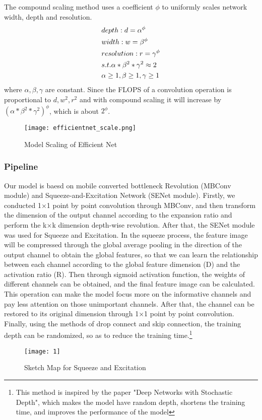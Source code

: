 \documentclass[final]{cvpr}
\begin{document}
The compound scaling method uses a coefficient $\phi$ to uniformly scales network width, depth and resolution.
\begin{equation}
\begin{aligned}
\centering
& depth: d=\alpha^\phi  \\
& width: w=\beta^\phi  \\
& resolution: r=\gamma^\phi  \\
&      s.t. \alpha*\beta^2*\gamma^2\approx2 \\
&           \alpha\geq1,\beta\geq1,\gamma\geq1
\end{aligned}
\end{equation}
where $\alpha,\beta,\gamma$ are constant. Since the FLOPS of a convolution operation is proportional to $d,w^2,r^2$ and with compound scaling it will increase by $(\alpha*\beta^2*\gamma^2)^\phi$, which is about $2^\phi$. 

\begin{figure}[htbp]
    \centering
    \texttt{[image: efficientnet\_scale.png]}
    \caption{Model Scaling of Efficient Net}
    \label{fig:my_label}
\end{figure}

\subsubsection{Pipeline}
   Our model is baesd on mobile converted bottleneck Revolution (MBConv module) 
    and Squeeze-and-Excitation Network (SENet module). 
    Firstly, we conducted 1$\times$1 point by point convolution through MBConv, 
    and then transform the dimension of the output channel according to 
    the expansion ratio and perform the k$\times$k dimension depth-wise 
    revolution. After that, the SENet module was used for Squeeze and 
    Excitation. In the squeeze process, the feature image will be 
    compressed through the global average pooling in the direction of 
    the output channel to obtain the global features, so that we can learn the 
    relationship between each channel according to the global feature 
    dimension (D) and the activation ratio (R). Then through sigmoid 
    activation function, the weights of different channels can be 
    obtained, and the final feature image can be calculated. This 
    operation can make the model focus more on the informative channels 
    and pay less attention on those unimportant channels. After that, 
    the channel can be restored to its original dimension through 1$\times$1 
    point by point convolution. Finally, using the methods of drop 
    connect and skip connection, the training depth can be randomized, 
    so as to reduce the training time.\footnote{This method is inspired by the paper "Deep Networks with Stochastic Depth", which makes the model have random depth, shortens the training time, and improves the performance of the model}
    \begin{figure}[h] 
      \centering
      \texttt{[image: 1]} 
      \caption{Sketch Map for Squeeze and Excitation} 
    \end{figure}
\end{document}
